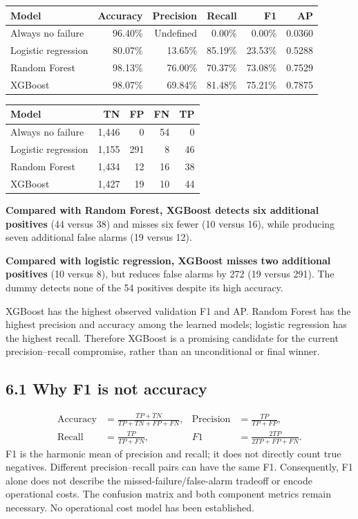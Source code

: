 \documentclass[11pt,a4paper]{article}
\begin{document}
\begin{center}
{\small
\begin{tabular}{lrrrrr}
\toprule
Model & Accuracy & Precision & Recall & F1 & AP \\
\midrule
Always no failure & 96.40\% & Undefined & 0.00\% & 0.00\% & 0.0360 \\
Logistic regression & 80.07\% & 13.65\% & 85.19\% & 23.53\% & 0.5288 \\
Random Forest & 98.13\% & 76.00\% & 70.37\% & 73.08\% & 0.7529 \\
XGBoost & 98.07\% & 69.84\% & 81.48\% & 75.21\% & 0.7875 \\
\bottomrule
\end{tabular}}
\end{center}

\begin{center}
\begin{tabular}{lrrrr}
\toprule
Model & TN & FP & FN & TP \\
\midrule
Always no failure & 1,446 & 0 & 54 & 0 \\
Logistic regression & 1,155 & 291 & 8 & 46 \\
Random Forest & 1,434 & 12 & 16 & 38 \\
XGBoost & 1,427 & 19 & 10 & 44 \\
\bottomrule
\end{tabular}
\end{center}

\textbf{Compared with Random Forest, XGBoost detects six additional positives}
(44 versus 38) and misses six fewer (10 versus 16), while producing seven
additional false alarms (19 versus 12).

\textbf{Compared with logistic regression, XGBoost misses two additional
positives} (10 versus 8), but reduces false alarms by 272 (19 versus 291).
The dummy detects none of the 54 positives despite its high accuracy.

XGBoost has the highest observed validation F1 and AP. Random Forest has
the highest precision and accuracy among the learned models; logistic
regression has the highest recall. Therefore XGBoost is a promising
candidate for the current precision--recall compromise, rather than an
unconditional or final winner.

\subsection*{6.1 Why F1 is not accuracy}
\[
\begin{aligned}
\text{Accuracy} &= \frac{TP+TN}{TP+TN+FP+FN},&
\text{Precision} &= \frac{TP}{TP+FP},\\
\text{Recall} &= \frac{TP}{TP+FN},&
F1 &= \frac{2TP}{2TP+FP+FN}.
\end{aligned}
\]
F1 is the harmonic mean of precision and recall; it does not directly count
true negatives. Different precision--recall pairs can have the same F1.
Consequently, F1 alone does not describe the missed-failure/false-alarm
tradeoff or encode operational costs. The confusion matrix and both component
metrics remain necessary. No operational cost model has been established.
\end{document}
